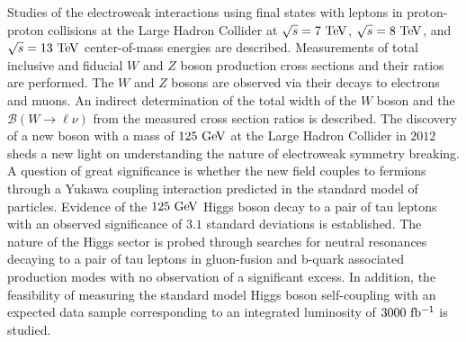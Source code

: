 % 
% 
%

Studies of the electroweak interactions using final states with leptons in proton-proton collisions at the Large Hadron Collider at $\sqrt{s}=7~\mathrm{Te\kern -0.1em V}$, $\sqrt{s}=8~\mathrm{Te\kern -0.1em V}$, and $\sqrt{s}=13~\mathrm{Te\kern -0.1em V}$ center-of-mass energies are described. Measurements of total inclusive and fiducial $W$ and $Z$ boson production cross sections and their ratios are performed. The $W$ and $Z$ bosons are observed via their decays to electrons and muons. An indirect determination of the total width of the $W$ boson and the $\mathcal{B}(W\rightarrow\ell\nu)$ from the measured cross section ratios is described. The discovery of a new boson with a mass of $125~\mathrm{Ge\kern -0.1em V}$ at the Large Hadron Collider in $2012$ sheds a new light on understanding the nature of electroweak symmetry breaking. A question of great significance is whether the new field couples to fermions through a Yukawa coupling interaction predicted in the standard model of particles. Evidence of the $125~\mathrm{Ge\kern -0.1em V}$ Higgs boson decay to a pair of tau leptons with an observed significance of $3.1$ standard deviations is established. The nature of the Higgs sector is probed through searches for neutral resonances decaying to a pair of tau leptons in gluon-fusion and b-quark associated production modes with no observation of a significant excess. In addition, the feasibility of measuring the standard model Higgs boson self-coupling with an expected data sample corresponding to an integrated luminosity of $3000~\mathrm{fb^{-1}}$ is studied.